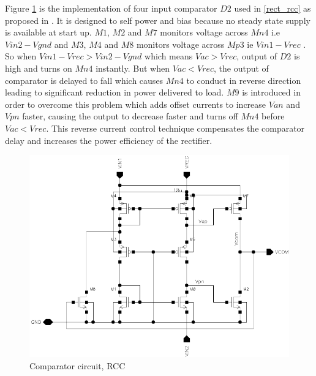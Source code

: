 \documentclass[UKenglish]{ifimaster}  %
\begin{document}
Figure \ref{rcc}  is the implementation of four input comparator $D2$ used in \ref{rect_rcc} as proposed in \cite{rectrcc}. It is designed to self power and bias because no steady state supply is available at start up. $M1$, $M2$ and $M7$ monitors voltage across $Mn4$ i.e $Vin2 - Vgnd$ and $M3$, $M4$ and $M8$ monitors voltage across $Mp3$ ie $Vin1 - Vrec$ . So when $Vin1 - Vrec > Vin2 - Vgnd$ which means $Vac > Vrec$, output of $D2$ is high and turns on $Mn4$ instantly. But when $Vac < Vrec$, the output of comparator is delayed to fall which causes $Mn4$ to conduct in reverse direction leading to significant reduction in power delivered to load. $M9$ is introduced in order to overcome this problem which adds offset currents to increase $Van$ and $Vpn$ faster, causing the output to decrease faster and turns off $Mn4$ before $Vac < Vrec$. This reverse current control technique compensates the comparator delay and increases the power efficiency of the rectifier. \\

\begin{figure}[htbp] %
   \centering
   \includegraphics[width=\textwidth]{img/rectifier_rcc5.pdf} 
   \caption{Comparator circuit, RCC }
   \label{rcc}
\end{figure}
\end{document}
